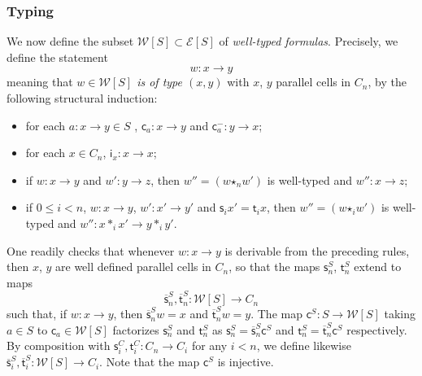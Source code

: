 \documentclass[reqno]{amsart}
\theoremstyle{plain}
\theoremstyle{definition}
\theoremstyle{remark}
\newcommand{\pair}[2]{(#1,#2)}       %
\newcommand{\source}{\mathsf{s}} %
\newcommand{\target}{\mathsf{t}} %
\newcommand{\comp}[1]{\ast_{#1}} %
\newcommand{\sce}[1]{\source_{#1}} %
\newcommand{\tge}[1]{\target_{#1}} %
\newcommand{\expr}[1]{\mathcal{E}[#1]} %
\newcommand{\WW}{\mathcal{W}}
\newcommand{\wtx}[1]{\WW[#1]} %
\newcommand{\formal}[1]{\mathsf{#1}} %
\newcommand{\fcst}[1]{\formal{c}_{#1}} %
\newcommand{\finv}[1]{\formal{c}^{\boldsymbol{-}}_{#1}}%
\newcommand{\fid}[1]{\formal{i}_{#1}} %
\newcommand{\fcomp}[1]{\bm{\star}_{#1}} %
\newcommand{\type}[3]{#1:#2\to #3} %
\newcommand{\finc}[1]{\formal{c}^{#1}}%
\newcommand{\scex}[1]{\extend{\source}_{#1}}
\newcommand{\tgex}[1]{\extend{\target}_{#1}}
\newcommand{\extend}[1]{\overline{#1}} %
\begin{document}
\subsubsection{Typing}\label{ssubsec:types}
We now define the
subset  $\wtx S\subset\expr S$ of {\em well-typed formulas}.
Precisely, we define the statement
\[\type wxy\]
meaning that {\em $w\in\wtx S$ is of type $\pair xy$} with $x$, $y$ parallel
cells in $C_n$, by the following structural induction:
\begin{itemize}
\item for each $a:x\to y\in S$ ,
  $\type{\fcst{a}}{x}{y}$
  and $\type{\finv{a}}{y}{x}$;
\item for  each $x\in C_n$, $\type{\fid{x}}{x}{x}$;
 \item if $\type wxy$ and $\type{w'}yz$, then $w''=(w\fcomp n w')$ is
   well-typed and $\type{w''}{x}{z}$;
 \item if $0\leq i<n$, $\type wxy$, $\type{w'}{x'}{y'}$ and $\sce
   i{x'}=\tge i{x}$, then $w''=(w\fcomp i w')$ is well-typed and
   $\type{w''}{x\comp i x'}{y\comp i y'}$. 
 \end{itemize}
 One readily checks that whenever $\type wxy$ is derivable from the
 preceding rules, then $x$, $y$ are well defined parallel cells in
 $C_n$, so that the maps $\sce n^S$, $\tge n^S$ extend to maps
 \[\scex n^S, \tgex n^S :\wtx S\to C_n\]
 such that, if $\type wxy$,  then $\scex n^S w=x$ and $\tgex n^S
 w=y$. The map $\finc S:S\to \wtx S$  taking
 $a\in S$ to $\fcst a\in\wtx S$ factorizes $\sce n^S$ and $\tge n^S$
 as $\sce n^S=\scex n^S \finc S$ and $\tge n^S=\tgex n^S\finc S$
 respectively. By composition with
 $\sce i^C,\tge i^C:C_n\to C_i$ for any $i<n$, we define likewise
 $\scex i^S,\tgex i^S:\wtx S\to C_i$. Note that the map $\finc S$ is injective. 
 
\end{document}
